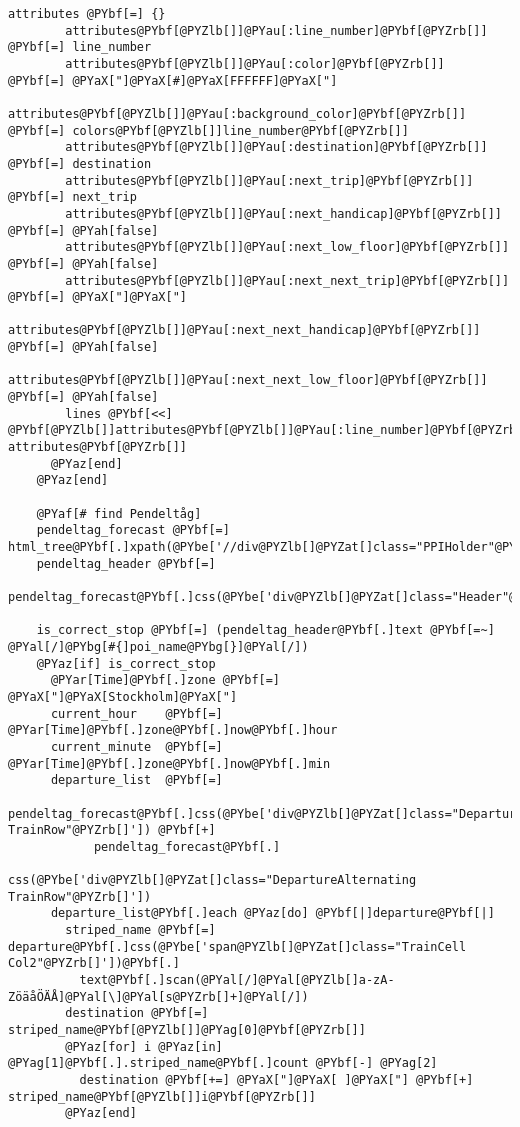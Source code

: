 \begin{Verbatim}[commandchars=@\[\]]
        attributes @PYbf[=] {}
        attributes@PYbf[@PYZlb[]]@PYau[:line_number]@PYbf[@PYZrb[]]       @PYbf[=] line_number
        attributes@PYbf[@PYZlb[]]@PYau[:color]@PYbf[@PYZrb[]]             @PYbf[=] @PYaX["]@PYaX[#]@PYaX[FFFFFF]@PYaX["]
        attributes@PYbf[@PYZlb[]]@PYau[:background_color]@PYbf[@PYZrb[]]  @PYbf[=] colors@PYbf[@PYZlb[]]line_number@PYbf[@PYZrb[]]
        attributes@PYbf[@PYZlb[]]@PYau[:destination]@PYbf[@PYZrb[]]       @PYbf[=] destination
        attributes@PYbf[@PYZlb[]]@PYau[:next_trip]@PYbf[@PYZrb[]]         @PYbf[=] next_trip
        attributes@PYbf[@PYZlb[]]@PYau[:next_handicap]@PYbf[@PYZrb[]]        @PYbf[=] @PYah[false]
        attributes@PYbf[@PYZlb[]]@PYau[:next_low_floor]@PYbf[@PYZrb[]]       @PYbf[=] @PYah[false]
        attributes@PYbf[@PYZlb[]]@PYau[:next_next_trip]@PYbf[@PYZrb[]]    @PYbf[=] @PYaX["]@PYaX["]
        attributes@PYbf[@PYZlb[]]@PYau[:next_next_handicap]@PYbf[@PYZrb[]]        @PYbf[=] @PYah[false]
        attributes@PYbf[@PYZlb[]]@PYau[:next_next_low_floor]@PYbf[@PYZrb[]]       @PYbf[=] @PYah[false]
        lines @PYbf[<<] @PYbf[@PYZlb[]]attributes@PYbf[@PYZlb[]]@PYau[:line_number]@PYbf[@PYZrb[]], attributes@PYbf[@PYZrb[]]
      @PYaz[end]
    @PYaz[end]
    
    @PYaf[# find Pendeltåg]
    pendeltag_forecast @PYbf[=] html_tree@PYbf[.]xpath(@PYbe['//div@PYZlb[]@PYZat[]class="PPIHolder"@PYZrb[]'])
    pendeltag_header @PYbf[=]
      pendeltag_forecast@PYbf[.]css(@PYbe['div@PYZlb[]@PYZat[]class="Header"@PYZrb[]'])@PYbf[.]css(@PYbe['h3'])
    
    is_correct_stop @PYbf[=] (pendeltag_header@PYbf[.]text @PYbf[=~] @PYal[/]@PYbg[#{]poi_name@PYbg[}]@PYal[/])
    @PYaz[if] is_correct_stop
      @PYar[Time]@PYbf[.]zone @PYbf[=] @PYaX["]@PYaX[Stockholm]@PYaX["]
      current_hour    @PYbf[=] @PYar[Time]@PYbf[.]zone@PYbf[.]now@PYbf[.]hour
      current_minute  @PYbf[=] @PYar[Time]@PYbf[.]zone@PYbf[.]now@PYbf[.]min
      departure_list  @PYbf[=]
            pendeltag_forecast@PYbf[.]css(@PYbe['div@PYZlb[]@PYZat[]class="Departure TrainRow"@PYZrb[]']) @PYbf[+]
            pendeltag_forecast@PYbf[.]
              css(@PYbe['div@PYZlb[]@PYZat[]class="DepartureAlternating TrainRow"@PYZrb[]'])
      departure_list@PYbf[.]each @PYaz[do] @PYbf[|]departure@PYbf[|]
        striped_name @PYbf[=] departure@PYbf[.]css(@PYbe['span@PYZlb[]@PYZat[]class="TrainCell Col2"@PYZrb[]'])@PYbf[.]
          text@PYbf[.]scan(@PYal[/]@PYal[@PYZlb[]a-zA-ZöäåÖÄÅ]@PYal[\]@PYal[s@PYZrb[]+]@PYal[/])
        destination @PYbf[=] striped_name@PYbf[@PYZlb[]]@PYag[0]@PYbf[@PYZrb[]]
        @PYaz[for] i @PYaz[in] @PYag[1]@PYbf[.].striped_name@PYbf[.]count @PYbf[-] @PYag[2]
          destination @PYbf[+=] @PYaX["]@PYaX[ ]@PYaX["] @PYbf[+] striped_name@PYbf[@PYZlb[]]i@PYbf[@PYZrb[]]
        @PYaz[end]
        

\end{Verbatim}
